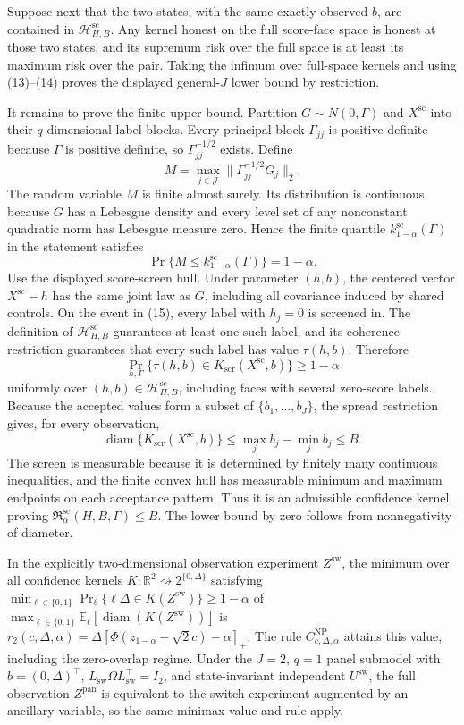 Suppose next that the two states, with the same exactly observed \(b\), are contained in \(\mathcal H_{H,B}^{\mathrm{sc}}\). Any kernel honest on the full score-face space is honest at those two states, and its supremum risk over the full space is at least its maximum risk over the pair. Taking the infimum over full-space kernels and using (13)--(14) proves the displayed general-\(J\) lower bound by restriction.

It remains to prove the finite upper bound. Partition \(G\sim N(0,\Gamma)\) and \(X^{\mathrm{sc}}\) into their \(q\)-dimensional label blocks. Every principal block \(\Gamma_{jj}\) is positive definite because \(\Gamma\) is positive definite, so \(\Gamma_{jj}^{-1/2}\) exists. Define
\[
 M=\max_{j\in\mathcal J}
 \lVert\Gamma_{jj}^{-1/2}G_j\rVert_2.
\]
The random variable \(M\) is finite almost surely. Its distribution is continuous because \(G\) has a Lebesgue density and every level set of any nonconstant quadratic norm has Lebesgue measure zero. Hence the finite quantile \(k_{1-\alpha}^{\mathrm{sc}}(\Gamma)\) in the statement satisfies
\[
 \Pr\{M\leq k_{1-\alpha}^{\mathrm{sc}}(\Gamma)\}=1-\alpha.
 \tag{15}
\]
Use the displayed score-screen hull. Under parameter \((h,b)\), the centered vector \(X^{\mathrm{sc}}-h\) has the same joint law as \(G\), including all covariance induced by shared controls. On the event in (15), every label with \(h_j=0\) is screened in. The definition of \(\mathcal H_{H,B}^{\mathrm{sc}}\) guarantees at least one such label, and its coherence restriction guarantees that every such label has value \(\tau(h,b)\). Therefore
\[
 \Pr_{h,\Gamma}\{\tau(h,b)\in K_{\mathrm{scr}}(X^{\mathrm{sc}},b)\}
 \geq1-\alpha
\]
uniformly over \((h,b)\in\mathcal H_{H,B}^{\mathrm{sc}}\), including faces with several zero-score labels. Because the accepted values form a subset of \(\{b_1,\ldots,b_J\}\), the spread restriction gives, for every observation,
\[
 \operatorname{diam}\{K_{\mathrm{scr}}(X^{\mathrm{sc}},b)\}
 \leq \max_j b_j-\min_j b_j\leq B.
\]
The screen is measurable because it is determined by finitely many continuous inequalities, and the finite convex hull has measurable minimum and maximum endpoints on each acceptance pattern. Thus it is an admissible confidence kernel, proving \(\mathfrak R_{\alpha}^{\mathrm{sc}}(H,B,\Gamma)\leq B\). The lower bound by zero follows from nonnegativity of diameter.

In the explicitly two-dimensional observation experiment \(Z^{\mathrm{sw}}\), the minimum over all confidence kernels \(K:\mathbb R^2\rightsquigarrow2^{\{0,\Delta\}}\) satisfying \(\min_{\ell\in\{0,1\}}\Pr_{\ell}\{\ell\Delta\in K(Z^{\mathrm{sw}})\}\geq1-\alpha\) of \(\max_{\ell\in\{0,1\}}\mathbb E_{\ell}[\operatorname{diam}(K(Z^{\mathrm{sw}}))]\) is \(r_2(c,\Delta,\alpha)=\Delta[\Phi(z_{1-\alpha}-\sqrt2c)-\alpha]_+\). The rule \(C^{\mathrm{NP}}_{c,\Delta,\alpha}\) attains this value, including the zero-overlap regime. Under the \(J=2\), \(q=1\) panel submodel with \(b=(0,\Delta)^{\top}\), \(L_{\mathrm{sw}}\Omega L_{\mathrm{sw}}^{\top}=I_2\), and state-invariant independent \(U^{\mathrm{sw}}\), the full observation \(Z^{\mathrm{pan}}\) is equivalent to the switch experiment augmented by an ancillary variable, so the same minimax value and rule apply.
